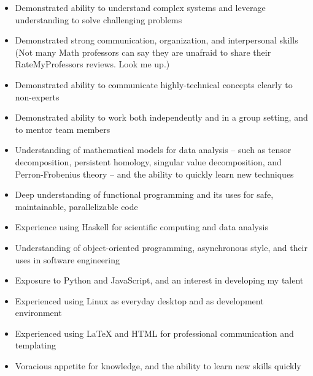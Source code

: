\documentclass[10pt]{article}
\begin{document}
\vfill
{}

  \begin{itemize}
    \item{
      Demonstrated ability to understand complex systems
      and leverage understanding to solve challenging problems
    }
    \item{
      Demonstrated strong communication, organization, and interpersonal skills
      (Not many Math professors can say they are unafraid to share their
      RateMyProfessors reviews. Look me up.)
    }
    \item{
      Demonstrated ability to communicate highly-technical concepts clearly
      to non-experts
    }
    \item{
      Demonstrated ability to work both independently and in a group setting,
      and to mentor team members
    }
    \item{
      Understanding of mathematical models for data analysis --
      such as tensor decomposition, persistent homology,
      singular value decomposition, and Perron-Frobenius theory --
      and the ability to quickly learn new techniques
    }
    \item{
      Deep understanding of functional programming
      and its uses for safe, maintainable, parallelizable code
    }
    \item{
      Experience using Haskell for scientific computing and data analysis
    }
    \item{
      Understanding of object-oriented programming, asynchronous style,
      and their uses in software engineering
    }
    \item{
      Exposure to Python and JavaScript, and an interest in developing my talent
    }
    \item{
      Experienced using Linux as everyday desktop
      and as development environment
    }
    \item{
      Experienced using LaTeX and HTML
      for professional communication and templating
    }
    \item{
      Voracious appetite for knowledge,
      and the ability to learn new skills quickly
    }
  \end{itemize}



\label{page:last}
\end{document}
